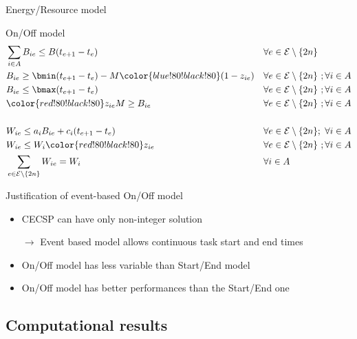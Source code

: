 \begin{frame}{Energy/Resource model}
  \vfill
  \begin{block}{On/Off model}
    {\footnotesize
      \begin{align*}
        &\sum_{i\in A} B_{ie} \le B(t_{e+1}-t_e) & &\forall e \in {\cal E}\setminus \{2n\}\\
        &B_{ie} \ge \bmin(t_{e+1}-t_e) - M{\color{blue!80!black!80}(1-z_{ie})} & & \forall e \in {\cal E}\setminus \{2n\}\ ;\forall i \in A\\
        &B_{ie} \le \bmax(t_{e+1}-t_e) & &\forall e \in {\cal E}\setminus \{2n\}\ ;\forall i \in A\\
        &{\color{red!80!black!80}z_{ie}}M\ge B_{ie} & & \forall e\in {\cal E}\setminus \{2n\}\
                           ;\forall i \in A\\
        & & & \\  &W_{ie} \le a_iB_{ie}+c_i(t_{e+1}-t_{e}) & & \forall e \in {\cal E}\setminus \{2n\};\ \forall i \in A\\
    &W_{ie} \le W_i{\color{red!80!black!80}z_{ie}} & & \forall e \in {\cal E}\setminus \{2n\}\ ;\forall i \in A\\
    &\sum_{e \in {\cal E}\setminus \{2n\}} W_{ie} = W_i & & \forall i \in A    
      \end{align*}
      }
  \end{block}
  \vfill
\end{frame}

\begin{frame}{Justification of event-based On/Off  model}
  \begin{itemize}
  \item
    CECSP can have only non-integer solution

  $\rightarrow$ Event based model allows continuous task start and end times
  \vfill
  
\item On/Off model has less variable than Start/End model
  \vfill
  
\item On/Off model has better performances than the Start/End one
\end{itemize}
\end{frame}


\subsection{Computational results}

